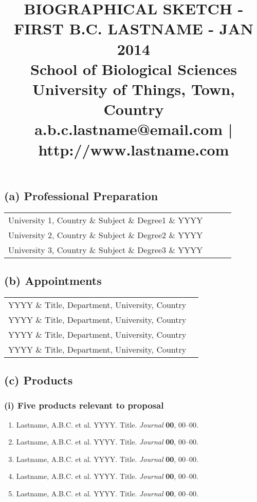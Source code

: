 \documentclass[10pt,letterpaper]{article}
\title{ \textbf{\Large BIOGRAPHICAL SKETCH - FIRST B.C. LASTNAME - JAN 2014} \\
{\normalsize School of Biological Sciences \\
University of Things, Town, Country \\
a.b.c.lastname@email.com | http://www.lastname.com} }
\author{}
\date{}
\begin{document}
\maketitle
\thispagestyle{empty}
\pagestyle{plain}


\subsection*{(a) Professional Preparation}

\begin{tabular}{l l l l}
University 1, Country \&  Subject \&  Degree1 \&  YYYY \\
University 2, Country \&  Subject \&  Degree2 \&  YYYY \\
University 3, Country \&  Subject \&  Degree3 \&  YYYY \\
\end{tabular}


\subsection*{(b) Appointments}

\begin{tabular}{l p{15cm} }
YYYY \& Title, Department, University, Country \\
YYYY \& Title, Department, University, Country \\
YYYY \& Title, Department, University, Country \\
YYYY \& Title, Department, University, Country \\
\end{tabular}

\subsection*{(c) Products}

\subsubsection*{(i) Five products relevant to proposal}

\begin{enumerate}
\item Lastname, A.B.C. et al. YYYY. Title. \emph{Journal} \textbf{00}, 00--00.
\item Lastname, A.B.C. et al. YYYY. Title. \emph{Journal} \textbf{00}, 00--00.
\item Lastname, A.B.C. et al. YYYY. Title. \emph{Journal} \textbf{00}, 00--00.
\item Lastname, A.B.C. et al. YYYY. Title. \emph{Journal} \textbf{00}, 00--00.
\item Lastname, A.B.C. et al. YYYY. Title. \emph{Journal} \textbf{00}, 00--00.
\end{enumerate}
\end{document}

